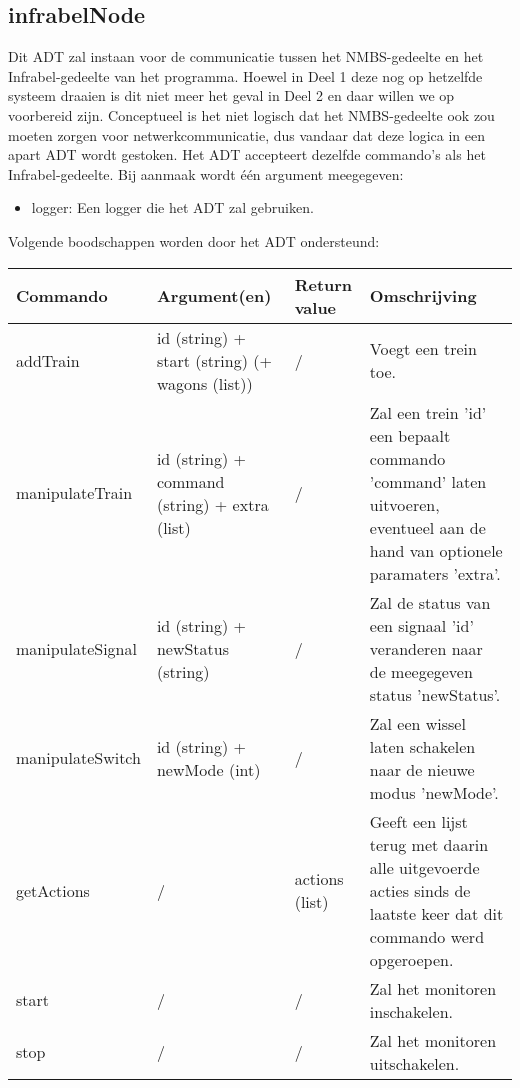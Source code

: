 \documentclass{article}
\begin{document}
\subsection{infrabelNode} %
Dit ADT zal instaan voor de communicatie tussen het NMBS-gedeelte en het Infrabel-gedeelte van het programma. Hoewel in Deel 1 deze nog op hetzelfde systeem draaien is dit niet meer het geval in Deel 2 en daar willen we op voorbereid zijn. Conceptueel is het niet logisch dat het NMBS-gedeelte ook zou moeten zorgen voor netwerkcommunicatie, dus vandaar dat deze logica in een apart ADT wordt gestoken. Het ADT accepteert dezelfde commando's als het Infrabel-gedeelte. Bij aanmaak wordt \'{e}\'{e}n argument meegegeven:
\begin{itemize}
  \item logger: Een logger die het ADT zal gebruiken.
\end{itemize}
Volgende boodschappen worden door het ADT ondersteund:
\begin{center}
    \begin{tabular}{ | l | p{4cm} | l | p{6cm} |}
    \hline
    Commando & Argument(en) & Return value & Omschrijving \\ \hline
    addTrain & id (string) + start (string) (+ wagons (list)) & / & Voegt een trein toe. \\ \hline
    manipulateTrain & id (string) + command (string) + extra (list) & / & Zal een trein 'id' een bepaalt commando 'command' laten uitvoeren, eventueel aan de hand van optionele paramaters 'extra'. \\ \hline
    manipulateSignal & id (string) + newStatus (string) & / & Zal de status van een signaal 'id' veranderen naar de meegegeven status 'newStatus'. \\ \hline
    manipulateSwitch & id (string) + newMode (int) & / & Zal een wissel laten schakelen naar de nieuwe modus 'newMode'. \\ \hline
    getActions & / & actions (list) & Geeft een lijst terug met daarin alle uitgevoerde acties sinds de laatste keer dat dit commando werd opgeroepen. \\ \hline
    start & / & / & Zal het monitoren inschakelen. \\ \hline
    stop & / & / & Zal het monitoren uitschakelen. \\ \hline
    \end{tabular}
\end{center}

\newpage
\end{document}
